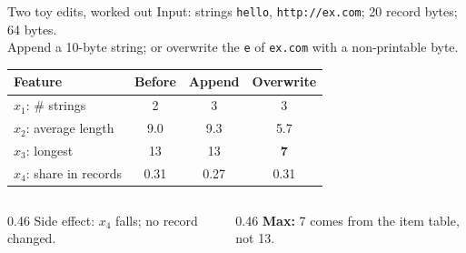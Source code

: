\documentclass[aspectratio=169,11pt]{beamer}
\newcommand{\bad}[1]{\textcolor{red!70!black}{#1}}
\begin{document}
\begin{frame}{Two toy edits, worked out}
  \small
  Input: strings \texttt{hello}, \texttt{http://ex.com}; 20 record bytes; 64 bytes.\\
  Append a 10-byte string; or overwrite the \texttt{e} of \texttt{ex.com} with a non-printable byte.
  \vfill
  \renewcommand{\arraystretch}{1.35}
  \begin{center}
    \normalsize
    \begin{tabular}{@{}lccc@{}}
      \toprule
      \textbf{Feature} & \textbf{Before} & \textbf{Append} & \textbf{Overwrite} \\
      \midrule
      $x_1$: \# strings & 2 & 3 & 3 \\
      $x_2$: average length & 9.0 & 9.3 & 5.7 \\
      $x_3$: longest & 13 & 13 & \textbf{7} \\
      $x_4$: share in records & 0.31 & \bad{0.27} & 0.31 \\
      \bottomrule
    \end{tabular}
  \end{center}
  \vfill
  \begin{columns}[T]
    \begin{column}{0.46\textwidth}
      \bad{Side effect:} $x_4$ falls; no record changed.
    \end{column}
    \begin{column}{0.46\textwidth}
      \textbf{Max:} 7 comes from the item table, not 13.
    \end{column}
  \end{columns}
\end{frame}
\end{document}

